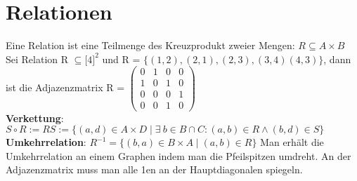 \documentclass[11pt]{article}
\begin{document}
\section{Relationen}
Eine Relation ist eine Teilmenge des Kreuzprodukt zweier Mengen: $R \subseteq A \times B$ \\
Sei Relation R $\subseteq {[}4{]}^2$ und R = $\{(1,2), (2,1), (2,3), (3,4) (4,3)\}$, dann ist die Adjazenzmatrix R = $\begin{pmatrix} 0 & 1 & 0 & 0 \\ 1 & 0 & 1 & 0 \\ 0 & 0 & 0 & 1 \\ 0 & 0 & 1 & 0 \end{pmatrix} $ \\
{\bfseries Verkettung}: $S \circ R := RS := \{(a,d) \in A \times D \mid \exists ~ b \in B \cap C\colon (a,b) \in R \land (b,d) \in S\}$ \\
{\bfseries Umkehrrelation}: $R^{-1} = \{(b,a) \in B \times A \mid (a,b) \in R\}$ Man erh{\"a}lt die Umkehrrelation an einem Graphen indem man die Pfeilspitzen umdreht. An der Adjazenzmatrix muss man alle 1en an der Hauptdiagonalen spiegeln.
\end{document}
